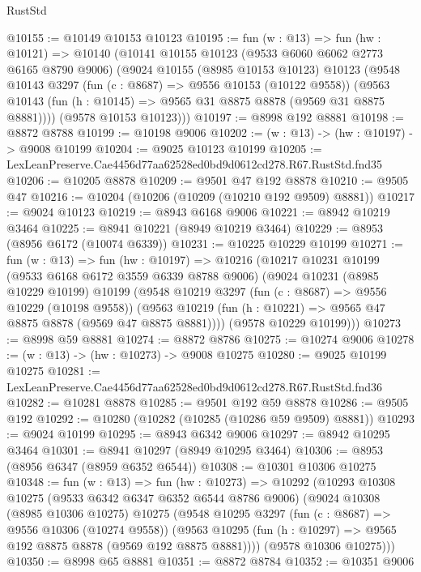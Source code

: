\begin{lexlean}{RustStd}
\begin{coremodule}
@10155 := @10149 @10153 @10123
@10195 := fun (w : @13) =>
  fun (hw : @10121) =>
  @10140
    (@10141
      @10155
      @10123
      (@9533 @6060 @6062 @2773 @6165 @8790 @9006)
      (@9024
        @10155
        (@8985 @10153 @10123)
        @10123
        (@9548
          @10143
          @3297
          (fun (c : @8687) => @9556 @10153 (@10122 @9558))
          (@9563 @10143 (fun (h : @10145) => @9565 @31 @8875 @8878 (@9569 @31 @8875 @8881))))
        (@9578 @10153 @10123)))
@10197 := @8998 @192 @8881
@10198 := @8872 @8788
@10199 := @10198 @9006
@10202 := (w : @13) -> (hw : @10197) -> @9008 @10199
@10204 := @9025 @10123 @10199
@10205 := LexLeanPreserve.Cae4456d77aa62528ed0bd9d0612cd278.R67.RustStd.fnd35
@10206 := @10205 @8878
@10209 := @9501 @47 @192 @8878
@10210 := @9505 @47
@10216 := @10204 (@10206 (@10209 (@10210 @192 @9509) @8881))
@10217 := @9024 @10123
@10219 := @8943 @6168 @9006
@10221 := @8942 @10219 @3464
@10225 := @8941 @10221 (@8949 @10219 @3464)
@10229 := @8953 (@8956 @6172 (@10074 @6339))
@10231 := @10225 @10229 @10199
@10271 := fun (w : @13) =>
  fun (hw : @10197) =>
  @10216
    (@10217
      @10231
      @10199
      (@9533 @6168 @6172 @3559 @6339 @8788 @9006)
      (@9024
        @10231
        (@8985 @10229 @10199)
        @10199
        (@9548
          @10219
          @3297
          (fun (c : @8687) => @9556 @10229 (@10198 @9558))
          (@9563 @10219 (fun (h : @10221) => @9565 @47 @8875 @8878 (@9569 @47 @8875 @8881))))
        (@9578 @10229 @10199)))
@10273 := @8998 @59 @8881
@10274 := @8872 @8786
@10275 := @10274 @9006
@10278 := (w : @13) -> (hw : @10273) -> @9008 @10275
@10280 := @9025 @10199 @10275
@10281 := LexLeanPreserve.Cae4456d77aa62528ed0bd9d0612cd278.R67.RustStd.fnd36
@10282 := @10281 @8878
@10285 := @9501 @192 @59 @8878
@10286 := @9505 @192
@10292 := @10280 (@10282 (@10285 (@10286 @59 @9509) @8881))
@10293 := @9024 @10199
@10295 := @8943 @6342 @9006
@10297 := @8942 @10295 @3464
@10301 := @8941 @10297 (@8949 @10295 @3464)
@10306 := @8953 (@8956 @6347 (@8959 @6352 @6544))
@10308 := @10301 @10306 @10275
@10348 := fun (w : @13) =>
  fun (hw : @10273) =>
  @10292
    (@10293
      @10308
      @10275
      (@9533 @6342 @6347 @6352 @6544 @8786 @9006)
      (@9024
        @10308
        (@8985 @10306 @10275)
        @10275
        (@9548
          @10295
          @3297
          (fun (c : @8687) => @9556 @10306 (@10274 @9558))
          (@9563 @10295 (fun (h : @10297) => @9565 @192 @8875 @8878 (@9569 @192 @8875 @8881))))
        (@9578 @10306 @10275)))
@10350 := @8998 @65 @8881
@10351 := @8872 @8784
@10352 := @10351 @9006

\end{coremodule}
\end{lexlean}
